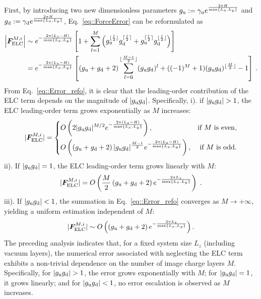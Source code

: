 First, by introducing two new dimensionless parameters $g_{\text{u}}:=\gamma_{\text{u}}e^{\frac{2\pi H}{\max\{L_x,L_y\}}}$ and $g_{\text{d}}:=\gamma_{\text{d}}e^{\frac{2\pi H}{\max\{L_x,L_y\}}}$, Eq.~\eqref{eq::ForceError} can be reformulated as
\begin{equation}
   \label{eq::Error_refo}
   \begin{aligned} \left|\bm{F}_{\text{ELC}}^{M,i}\right|&\sim e^{-\frac{2\pi(L_z-H)}{\max\{L_x,L_y\}}} \left[ 1 + \sum_{l=1}^{M} \left( g_{\text{u}}^{\lfloor \frac{l}{2} \rfloor} g_{\text{d}}^{\lceil \frac{l}{2} \rceil} + g_{\text{u}}^{\lceil \frac{l}{2} \rceil} g_{\text{d}}^{\lfloor \frac{l}{2} \rfloor} \right) \right]\\
   &=e^{-\frac{2\pi(L_z-H)}{\max\{L_x,L_y\}}}\left[(g_{\text{u}} + g_{\text{d}} + 2) \sum_{l = 0}^{\lfloor \frac{M - 1}{2} \rfloor} (g_{\text{u}}g_{\text{d}})^{l} + ((-1)^{M}+1) (g_{\text{u}}g_{\text{d}})^{\lfloor \frac{M}{2} \rfloor} - 1\right]\,.
   \end{aligned}
\end{equation}
From Eq.~\eqref{eq::Error_refo}, it is clear that the leading-order contribution of the ELC term depends on the magnitude of $|g_{\text{u}}g_{\text{d}}|$. 
Specifically, i). if $|g_{\text{u}}g_{\text{d}}| > 1$, the ELC leading-order term grows exponentially as $M$ increases:
\begin{equation}\label{eq::lhs_bigger1}
   \lvert\boldsymbol{F}_{\text{ELC}}^{M,i}\rvert =  \left\{
	\begin{aligned}
		& O \left(2 \lvert g_{\text{u}} g_{\text{d}}\rvert^{M/2} e^{-\frac{2\pi (L_z - H)}{\max\{L_x,L_y\}}} \right) , & \text{if $M$ is even,}\\
		& O \left( \left(g_{\text{u}} + g_{\text{d}}+2\right)\lvert g_{\text{u}} g_{\text{d}}\rvert^{\frac{M-1}{2}} e^{-\frac{2\pi (L_z -H)}{\max\{L_x,L_y\}}} \right) , & \text{if $M$ is odd.}
	\end{aligned}
	\right.
\end{equation} 
ii). If $|g_{\text{u}}g_{\text{d}}|=1$, the ELC leading-order term grows linearly with $M$:
\begin{equation}
\label{eq::lhs_1}
\lvert\boldsymbol{F}_{\text{ELC}}^{M,i}\rvert = O \left( \frac{M}{2}\left(g_{\text{u}} + g_{\text{d}}+2\right)e^{-\frac{2\pi L_z}{\max\{L_x,L_y\}}} \right)\;.
\end{equation}
iii). If $|g_{\text{u}}g_{\text{d}}|<1$, the summation in Eq.~\eqref{eq::Error_refo} converges as $M\rightarrow +\infty$, yielding a uniform estimation independent of $M$:
\begin{equation}
\label{eq::lhs_less1}
\lvert\boldsymbol{F}_{\text{ELC}}^{M,i}\rvert \sim O \left( \left(g_{\text{u}}+g_{\text{d}}+2\right)e^{-\frac{2\pi L_z}{\max\{L_x,L_y\}}} \right).
\end{equation}
The preceding analysis indicates that, for a fixed system size \( L_z \) (including vacuum layers), the numerical error associated with neglecting the ELC term exhibits a non-trivial dependence on the number of image charge layers \( M \). 
Specifically, for \( |g_{\T u}g_{\T d}|>1 \), the error grows exponentially with \( M \);
for \( |g_{\text{u}}g_{\text{d}}| = 1 \), it grows linearly; and for \( |g_{\text{u}}g_{\text{d}}| < 1 \), no error escalation is observed as \( M \) increases.

